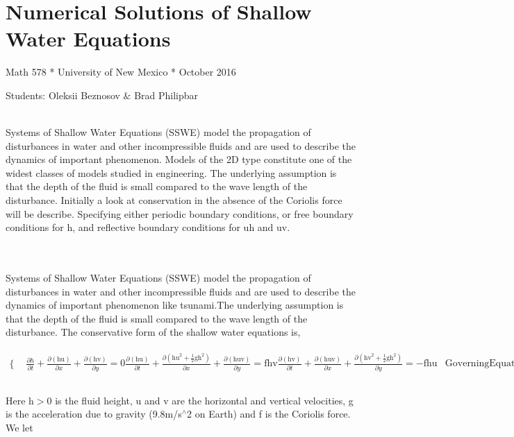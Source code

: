 \documentclass{article}
\begin{document}
\section*{Numerical Solutions of Shallow Water Equations}

Math 578 * University of New Mexico * October 2016

Students: Oleksii Beznosov $\&$ Brad Philipbar

 \\
Systems of Shallow Water Equations (SSWE) model the propagation of disturbances in water and other incompressible fluids and are used to describe
the dynamics of important phenomenon. Models of the 2D type constitute one of the widest classes of models studied in engineering. The underlying
assumption is that the depth of the fluid is small compared to the wave length of the disturbance. Initially a look at conservation in the absence
of the Coriolis force will be describe. Specifying either periodic boundary conditions, or free boundary conditions for h, and reflective boundary
conditions for uh and uv. 

\\
 \\
Systems of Shallow Water Equations (SSWE) model the propagation of disturbances in water and other incompressible fluids and are used to describe
the dynamics of important phenomenon like tsunami.The underlying assumption is that the depth of the fluid is small compared to the wave length of
the disturbance. The conservative form of the shallow water equations is,

\(\begin{array}{ll}
 \{ & 
\begin{array}{ll}
 \frac{\partial h}{\partial t}+\frac{\partial (\text{hu})}{\partial x}+\frac{\partial (\text{hv})}{\partial y}=0\frac{\partial (\text{hu})}{\partial
t}+\frac{\partial \left(\text{hu}^2+\frac{1}{2}\text{gh}^2\right)}{\partial x}+\frac{\partial (\text{huv})}{\partial y}=\text{fhv}\frac{\partial
(\text{hv})}{\partial t}+\frac{\partial (\text{huv})}{\partial x}+\frac{\partial \left(\text{hv}^2+\frac{1}{2}\text{gh}^2\right)}{\partial y}=-\text{fhu}
& \text{Governing} \text{Equations}(1) \\
\end{array}
 \\
\end{array}\)

Here h$>$0 is the fluid height, u and v are the horizontal and vertical velocities, g is the acceleration due to gravity (9.8m/s${}^{\wedge}$2 on
Earth) and f is the Coriolis force. We let
\end{document}
